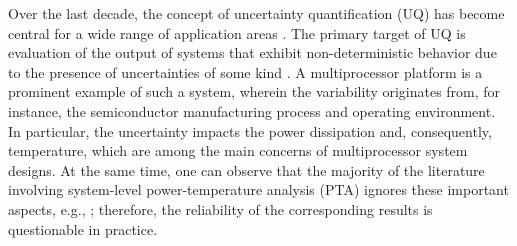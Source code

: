 Over the last decade, the concept of uncertainty quantification (UQ) has become central for a wide range of application areas \cite{xiu2010}. The primary target of UQ is evaluation of the output of systems that exhibit non-deterministic behavior due to the presence of uncertainties of some kind \cite{eldred2009}. A multiprocessor platform is a prominent example of such a system, wherein the variability originates from, for instance, the semiconductor manufacturing process and operating environment. In particular, the uncertainty impacts the power dissipation and, consequently, temperature, which are among the main concerns of multiprocessor system designs. At the same time, one can observe that the majority of the literature involving system-level power-temperature analysis (PTA) ignores these important aspects, e.g., \cite{yang2010, rai2011, fisher2011, thiele2011, ukhov2012}; therefore, the reliability of the corresponding results is questionable in practice.

